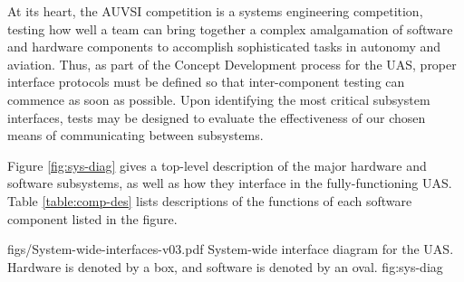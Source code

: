 \documentclass[]{auvsi_doc}
\begin{document}
\begin{AUVSITitlePage}
\begin{artifacttable}
\end{artifacttable}
\end{AUVSITitlePage}

At its heart, the AUVSI competition is a systems engineering competition, testing how well a team can bring together a complex amalgamation of software and hardware components to accomplish sophisticated tasks in autonomy and aviation. Thus, as part of the Concept Development process for the UAS, proper interface protocols must be defined so that inter-component testing can commence as soon as possible. Upon identifying the most critical subsystem interfaces, tests may be designed to evaluate the effectiveness of our chosen means of communicating between subsystems.

Figure \ref{fig:sys-diag} gives a top-level description of the major hardware and software subsystems, as well as how they interface in the fully-functioning UAS. Table \ref{table:comp-des} lists descriptions of the functions of each software component listed in the figure.

\vspace{0.3cm}

\AUVSIFigure
{{figs/System-wide-interfaces-v03.pdf}}
{\textwidth}
{System-wide interface diagram for the UAS. Hardware is denoted by a box, and software is denoted by an oval.}
{fig:sys-diag}
\end{document}
